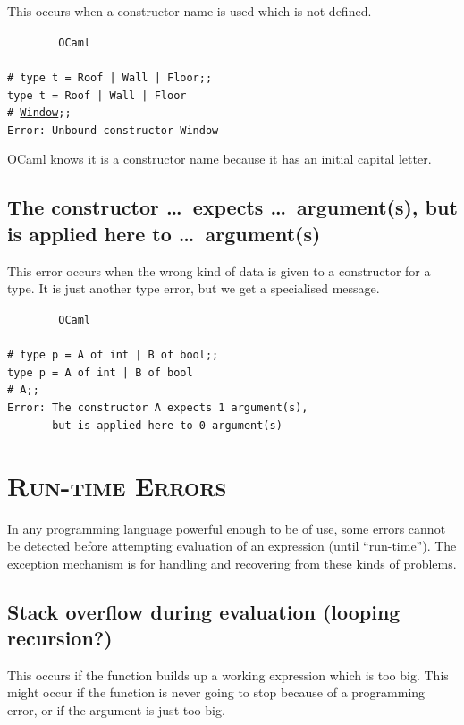 \documentclass[]{book}
\newcommand{\smspace}{\vspace{4mm}}
\begin{document}
This occurs when a constructor name is used which is not defined.

\smspace
\noindent\verb!        OCaml!\\
\noindent\\
\texttt{\# type t = Roof | Wall | Floor;;}\\
\texttt{type t = Roof | Wall | Floor}\\
\texttt{\# \underline{Window};;}\\
\texttt{Error:\ Unbound constructor Window}
\smspace

\noindent OCaml knows it is a constructor name because it has an initial capital letter.

\subsection*{The constructor \ldots\ expects \ldots\ argument(s), but is applied here to \ldots\ argument(s)}

This error occurs when the wrong kind of data is given to a constructor for a type. It is just another type error, but we get a specialised message.

\smspace
\noindent\verb!        OCaml!\\
\noindent\\
\texttt{\# type p = A of int | B of bool;;}\\
\texttt{type p = A of int | B of bool}\\
\texttt{\# A;;}\\
\texttt{Error:\ The constructor A expects 1 argument(s),}\\
\verb!       !\texttt{but is applied here to 0 argument(s)}
\smspace

\section*{\scshape Run-time Errors}

In any programming language powerful enough to be of use, some errors cannot be detected before attempting evaluation of an expression (until ``run-time''). The exception mechanism is for handling and recovering from these kinds of problems.

\subsection*{Stack overflow during evaluation (looping recursion?)}

This occurs if the function builds up a working expression which is too big. This might occur if the function is never going to stop because of a programming error, or if the argument is just too big.
\end{document}
